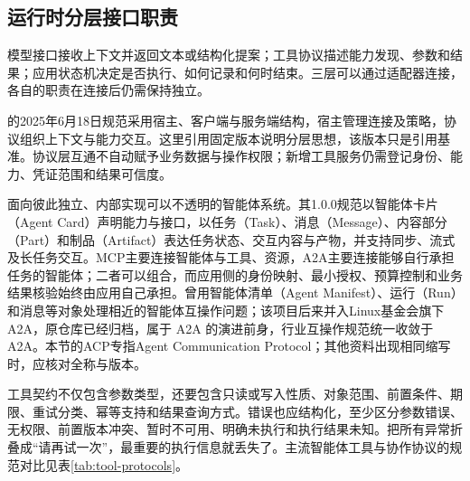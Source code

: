 \documentclass[../textbook.tex]{subfiles}
\begin{document}
\subsection{运行时分层接口职责}
模型接口接收上下文并返回文本或结构化提案；工具协议描述能力发现、参数和结果；应用状态机决定是否执行、如何记录和何时结束。三层可以通过适配器连接，各自的职责在连接后仍需保持独立。

的2025年6月18日规范采用宿主、客户端与服务端结构，宿主管理连接及策略，协议组织上下文与能力交互\cite{mcp2025architecture}。这里引用固定版本说明分层思想，该版本只是引用基准。协议层互通不自动赋予业务数据与操作权限；新增工具服务仍需登记身份、能力、凭证范围和结果可信度。

面向彼此独立、内部实现可以不透明的智能体系统。其1.0.0规范以智能体卡片（Agent Card）声明能力与接口，以任务（Task）、消息（Message）、内容部分（Part）和制品（Artifact）表达任务状态、交互内容与产物，并支持同步、流式及长任务交互\cite{a2a2026spec100}。MCP主要连接智能体与工具、资源，A2A主要连接能够自行承担任务的智能体；二者可以组合，而应用侧的身份映射、最小授权、预算控制和业务结果核验始终由应用自己承担。曾用智能体清单（Agent Manifest）、运行（Run）和消息等对象处理相近的智能体互操作问题；该项目后来并入Linux基金会旗下A2A，原仓库已经归档\cite{acp2025archive}，属于 A2A 的演进前身，行业互操作规范统一收敛于 A2A。本节的ACP专指Agent Communication Protocol；其他资料出现相同缩写时，应核对全称与版本。

工具契约不仅包含参数类型，还要包含只读或写入性质、对象范围、前置条件、期限、重试分类、幂等支持和结果查询方式。错误也应结构化，至少区分参数错误、无权限、前置版本冲突、暂时不可用、明确未执行和执行结果未知。把所有异常折叠成“请再试一次”，最重要的执行信息就丢失了。主流智能体工具与协作协议的规范对比见表\ref{tab:tool-protocols}。
\end{document}
